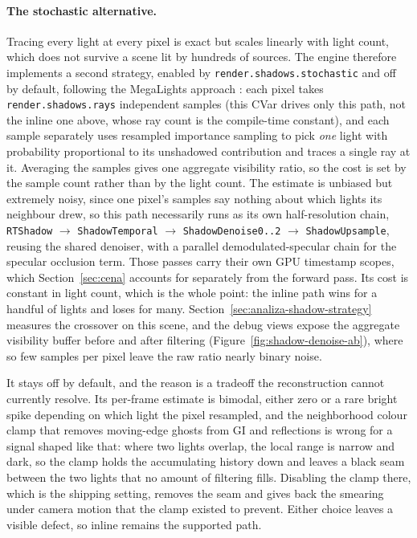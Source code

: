 \paragraph{The stochastic alternative.} Tracing every light at every pixel is exact but scales
linearly with light count, which does not survive a scene lit by hundreds of sources. The engine
therefore implements a second strategy, enabled by \texttt{render.shadows.stochastic} and off by
default, following the MegaLights approach \cite{epic_megalights}: each pixel takes
\texttt{render.shadows.rays} independent samples (this CVar drives only this path, not the inline one
above, whose ray count is the compile-time constant), and each sample separately uses resampled
importance sampling \cite{talbot2005ris} to pick \emph{one} light with
probability proportional to its unshadowed contribution and traces a single ray at it. Averaging the
samples gives one aggregate visibility ratio, so the cost is set by the sample count rather than by
the light count.
The estimate is unbiased but extremely noisy, since one pixel's samples say nothing about which
lights its neighbour drew, so this path necessarily runs as its own half-resolution chain,
\texttt{RTShadow} $\rightarrow$ \texttt{ShadowTemporal} $\rightarrow$ \texttt{ShadowDenoise0..2}
$\rightarrow$ \texttt{ShadowUpsample}, reusing the shared denoiser, with a parallel
demodulated-specular chain for the specular occlusion term. Those passes carry their own GPU timestamp
scopes, which Section~\ref{sec:cena} accounts for separately from the forward pass. Its cost is
constant in light count, which is the whole point: the inline path wins for a handful of lights and
loses for many. Section~\ref{sec:analiza-shadow-strategy} measures the crossover on this scene, and
the debug views expose the aggregate visibility buffer before and after filtering
(Figure~\ref{fig:shadow-denoise-ab}), where so few samples per pixel leave the raw ratio nearly
binary noise.

It stays off by default, and the reason is a tradeoff the reconstruction cannot currently resolve. Its
per-frame estimate is bimodal, either zero or a rare bright spike depending on which light the pixel
resampled, and the neighborhood colour clamp that removes moving-edge ghosts from GI and reflections
is wrong for a signal shaped like that: where two lights overlap, the local range is narrow and dark,
so the clamp holds the accumulating history down and leaves a black seam between the two lights that
no amount of filtering fills. Disabling the clamp there, which is the shipping setting, removes the
seam and gives back the smearing under camera motion that the clamp existed to prevent. Either
choice leaves a visible defect, so inline remains the supported path.

